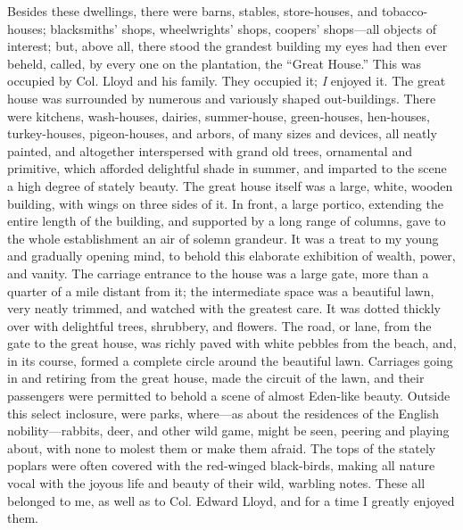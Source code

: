 Besides these dwellings, there were barns, stables, store-houses, and
tobacco-houses; blacksmiths' shops, wheelwrights' shops, coopers'
shops---all objects of interest; but, above all, there stood the
grandest building my eyes had then ever beheld, called, by every one on
the plantation, the ``Great House.'' This was occupied by Col. Lloyd and
his family. They occupied it; \emph{I} enjoyed it. The great house {}was
surrounded by numerous and variously shaped out-buildings. There were
kitchens, wash-houses, dairies, summer-house, green-houses, hen-houses,
turkey-houses, pigeon-houses, and arbors, of many sizes and devices, all
neatly painted, and altogether interspersed with grand old trees,
ornamental and primitive, which afforded delightful shade in summer, and
imparted to the scene a high degree of stately beauty. The great house
itself was a large, white, wooden building, with wings on three sides of
it. In front, a large portico, extending the entire length of the
building, and supported by a long range of columns, gave to the whole
establishment an air of solemn grandeur. It was a treat to my young and
gradually opening mind, to behold this elaborate exhibition of wealth,
power, and vanity. The carriage entrance to the house was a large gate,
more than a quarter of a mile distant from it; the intermediate space
was a beautiful lawn, very neatly trimmed, and watched with the greatest
care. It was dotted thickly over with delightful trees, shrubbery, and
flowers. The road, or lane, from the gate to the great house, was richly
paved with white pebbles from the beach, and, in its course, formed a
complete circle around the beautiful lawn. Carriages going in and
retiring from the great house, made the circuit of the lawn, and their
passengers were permitted to behold a scene of almost Eden-like beauty.
Outside this select inclosure, were parks, where---as about the
residences of the English nobility---rabbits, deer, and other wild game,
might be seen, peering and playing about, with none to molest them or
make them afraid. The {}tops of the stately poplars were often covered
with the red-winged black-birds, making all nature vocal with the joyous
life and beauty of their wild, warbling notes. These all belonged to me,
as well as to Col. Edward Lloyd, and for a time I greatly enjoyed them.

